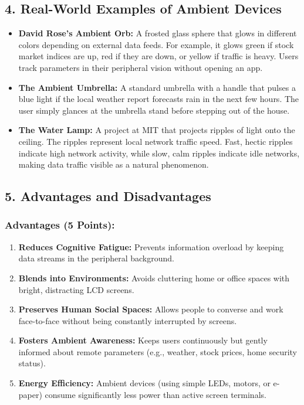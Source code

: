\subsection{4. Real-World Examples of Ambient Devices}
\begin{itemize}
  \item   \textbf{David Rose’s Ambient Orb:} A frosted glass sphere that glows in different colors depending on external data feeds. For example, it glows green if stock market indices are up, red if they are down, or yellow if traffic is heavy. Users track parameters in their peripheral vision without opening an app.
  \item   \textbf{The Ambient Umbrella:} A standard umbrella with a handle that pulses a blue light if the local weather report forecasts rain in the next few hours. The user simply glances at the umbrella stand before stepping out of the house.
  \item   \textbf{The Water Lamp:} A project at MIT that projects ripples of light onto the ceiling. The ripples represent local network traffic speed. Fast, hectic ripples indicate high network activity, while slow, calm ripples indicate idle networks, making data traffic visible as a natural phenomenon.
\end{itemize}


\subsection{5. Advantages and Disadvantages}

\subsubsection{Advantages (5 Points):}
\begin{enumerate}
  \item \textbf{Reduces Cognitive Fatigue:} Prevents information overload by keeping data streams in the peripheral background.
  \item \textbf{Blends into Environments:} Avoids cluttering home or office spaces with bright, distracting LCD screens.
  \item \textbf{Preserves Human Social Spaces:} Allows people to converse and work face-to-face without being constantly interrupted by screens.
  \item \textbf{Fosters Ambient Awareness:} Keeps users continuously but gently informed about remote parameters (e.g., weather, stock prices, home security status).
  \item \textbf{Energy Efficiency:} Ambient devices (using simple LEDs, motors, or e-paper) consume significantly less power than active screen terminals.
\end{enumerate}


